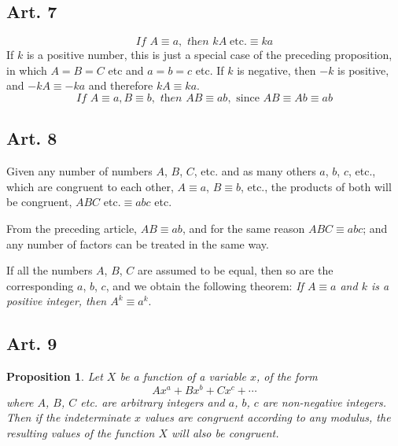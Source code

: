 \documentclass{book}
\theoremstyle{theorem}
\newtheorem{proposition}{Proposition}
\begin{document}
\subsection*{Art. 7} 
\[ \textit{If  }A \equiv a, \textit{ then } kA \;\mathrm{etc.} \equiv ka \]
If $k$ is a positive number, this is just a special case of the preceding proposition, in which $A=B=C$ etc and $a=b=c$ etc.  If $k$ is negative, then $-k$ is positive, and $-kA \equiv -ka$ and therefore $kA \equiv ka$.
\[ \textit{If  }A \equiv a, B \equiv b, \textit{ then } AB \equiv ab, \textrm{ since } AB \equiv Ab \equiv ab \]

\subsection*{Art. 8} Given any number of numbers $A$, $B$, $C$, etc. and as many others $a$, $b$, $c$, etc., which are congruent to each other, $A \equiv a$, $B \equiv b$, etc., the products of both will be congruent, $ABC$ etc.$\equiv abc$ etc.

From the preceding article, $AB \equiv ab$, and for the same reason $ABC \equiv abc$; and any number of factors can be treated in the same way.

If all the numbers $A$, $B$, $C$ are assumed to be equal, then so are the corresponding $a$, $b$, $c$, and we obtain the following theorem: \textit{If $A \equiv a$ and $k$ is a positive integer, then $A^k \equiv a^k$}.

\subsection*{Art. 9} 
\begin{proposition} Let $X$ be a function of a variable $x$, of the form
\[ A x^a + B x^b + C x^c + \cdots \]
where $A$, $B$, $C$ etc. are arbitrary integers and $a$, $b$, $c$ are non-negative integers.  Then if the indeterminate $x$ values are congruent according to any modulus, the resulting values of the function $X$ will also be congruent. \end{proposition}
\end{document}
